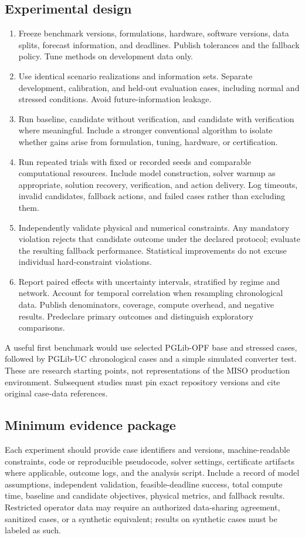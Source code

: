 \documentclass[11pt,letterpaper]{article}
\begin{document}
\subsection{Experimental design}
\begin{enumerate}
\item Freeze benchmark versions, formulations, hardware, software versions, data splits, forecast information, and deadlines. Publish tolerances and the fallback policy. Tune methods on development data only.
\item Use identical scenario realizations and information sets. Separate development, calibration, and held-out evaluation cases, including normal and stressed conditions. Avoid future-information leakage.
\item Run baseline, candidate without verification, and candidate with verification where meaningful. Include a stronger conventional algorithm to isolate whether gains arise from formulation, tuning, hardware, or certification.
\item Run repeated trials with fixed or recorded seeds and comparable computational resources. Include model construction, solver warmup as appropriate, solution recovery, verification, and action delivery. Log timeouts, invalid candidates, fallback actions, and failed cases rather than excluding them.
\item Independently validate physical and numerical constraints. Any mandatory violation rejects that candidate outcome under the declared protocol; evaluate the resulting fallback performance. Statistical improvements do not excuse individual hard-constraint violations.
\item Report paired effects with uncertainty intervals, stratified by regime and network. Account for temporal correlation when resampling chronological data. Publish denominators, coverage, compute overhead, and negative results. Predeclare primary outcomes and distinguish exploratory comparisons.
\end{enumerate}
A useful first benchmark would use selected PGLib-OPF base and stressed cases, followed by PGLib-UC chronological cases and a simple simulated converter test. These are research starting points, not representations of the MISO production environment. Subsequent studies must pin exact repository versions and cite original case-data references.

\subsection{Minimum evidence package}
Each experiment should provide case identifiers and versions, machine-readable constraints, code or reproducible pseudocode, solver settings, certificate artifacts where applicable, outcome logs, and the analysis script. Include a record of model assumptions, independent validation, feasible-deadline success, total compute time, baseline and candidate objectives, physical metrics, and fallback results. Restricted operator data may require an authorized data-sharing agreement, sanitized cases, or a synthetic equivalent; results on synthetic cases must be labeled as such.
\end{document}
